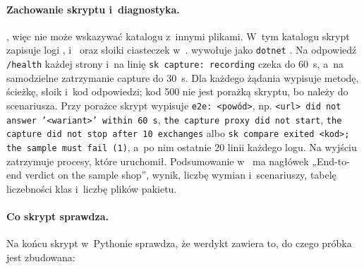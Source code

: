 \paragraph{Zachowanie skryptu i~diagnostyka.} , więc  nie
może wskazywać katalogu z~innymi plikami. W~tym katalogu skrypt zapisuje logi
,  i~ oraz słoiki
ciasteczek w~.  wywołuje jako \texttt{dotnet}
. Na odpowiedź
\texttt{/health} każdej strony i~na linię \texttt{sk capture: recording} czeka do 60~s,
a~na samodzielne zatrzymanie capture do 30~s. Dla każdego żądania wypisuje metodę,
ścieżkę, słoik i~kod odpowiedzi; kod 500 nie jest porażką skryptu, bo należy do scenariusza.
Przy porażce skrypt wypisuje \texttt{e2e: <powód>}, np. \texttt{<url> did not answer
'<wariant>' within 60 s}, \texttt{the capture proxy did not start}, \texttt{the capture did
not stop after 10 exchanges} albo \texttt{sk compare exited <kod>; the sample must fail (1)},
a~po nim ostatnie 20 linii każdego logu. Na wyjściu zatrzymuje procesy, które uruchomił.
Podsumowanie w~ ma nagłówek „End-to-end verdict on the
sample shop”, wynik, liczbę wymian i~scenariuszy, tabelę liczebności klas i~liczbę plików
pakietu.

\paragraph{Co skrypt sprawdza.} Na końcu skrypt w~Pythonie sprawdza, że werdykt zawiera to,
do czego próbka jest zbudowana:

